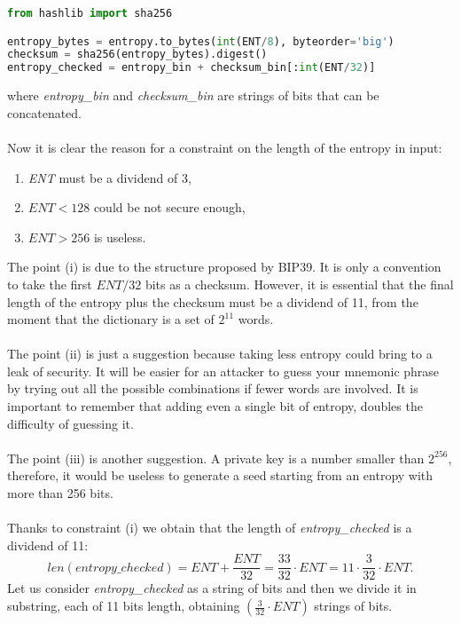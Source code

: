 \begin{lstlisting}[language=Python]
from hashlib import sha256

entropy_bytes = entropy.to_bytes(int(ENT/8), byteorder='big')
checksum = sha256(entropy_bytes).digest()
entropy_checked = entropy_bin + checksum_bin[:int(ENT/32)]
\end{lstlisting}
where \textit{entropy\_bin} and \textit{checksum\_bin} are strings of bits that can be concatenated.
\\ \\
Now it is clear the reason for a constraint on the length of the entropy in input: 
\begin{enumerate}[label=(\roman*)]
	\item \textit{ENT} must be a dividend of 3,
	\item $ENT<128$ could be not secure enough,
	\item $ENT>256$ is useless.
\end{enumerate}
The point (i) is due to the structure proposed by BIP39. It is only a convention to take the first $ENT/32$ bits as a checksum. However, it is essential that the final length of the entropy plus the checksum must be a dividend of 11, from the moment that the dictionary is a set of $2^{11}$ words.
\\ \\
The point (ii) is just a suggestion because taking less entropy could bring to a leak of security. It will be easier for an attacker to guess your mnemonic phrase by trying out all the possible combinations if fewer words are involved. It is important to remember that adding even a single bit of entropy, doubles the difficulty of guessing it.
\\ \\
The point (iii) is another suggestion. A private key is a number smaller than $2^{256}$, therefore, it would be useless to generate a seed starting from an entropy with more than 256 bits.
\\ \\
Thanks to constraint (i) we obtain that the length of \textit{entropy\_checked} is a dividend of 11:
\begin{equation*}
len(entropy\_checked)=ENT+\dfrac{ENT}{32}=\dfrac{33}{32}\cdot ENT=11\cdot \dfrac{3}{32}\cdot ENT.
\end{equation*}
Let us consider \textit{entropy\_checked} as a string of bits and then we divide it in substring, each of 11 bits length, obtaining $(\frac{3}{32}\cdot ENT)$ strings of bits.
\\ \\
